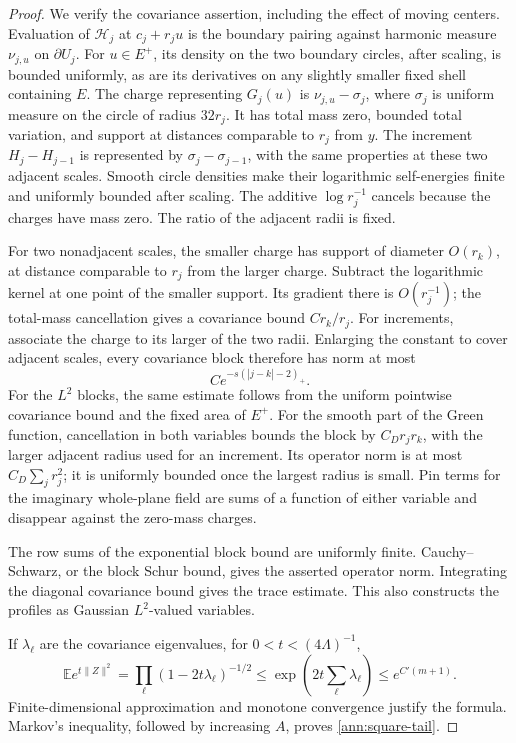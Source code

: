 \documentclass[11pt]{article}
\numberwithin{equation}{section}
\theoremstyle{definition}
\theoremstyle{remark}
\newcommand{\EE}{\mathbb E}
\newcommand{\1}{\mathbf 1}
\begin{document}
\begin{proof}
We verify the covariance assertion, including the effect of moving
centers.  Evaluation of \(\mathcal H_j\) at \(c_j+r_ju\)
is the boundary pairing against harmonic measure
\(\nu_{j,u}\) on \(\partial U_j\).  For \(u\in E^+\), its
density on the two boundary circles, after scaling, is bounded
uniformly, as are its derivatives on any slightly smaller fixed
shell containing \(E\).  The charge representing \(G_j(u)\)
is \(\nu_{j,u}-\sigma_j\), where \(\sigma_j\) is uniform measure
on the circle of radius \(32r_j\).  It has total mass zero,
bounded total variation, and support at distances comparable to
\(r_j\) from \(y\).  The increment \(H_j-H_{j-1}\) is represented
by \(\sigma_j-\sigma_{j-1}\), with the same properties at these
two adjacent scales.  Smooth circle densities make their logarithmic
self-energies finite and uniformly bounded after scaling.  The
additive \(\log r_j^{-1}\) cancels because the charges have mass
zero.  The ratio of the adjacent radii is fixed.

For two nonadjacent scales, the smaller charge has support of
diameter \(O(r_k)\), at distance comparable to \(r_j\) from
the larger charge.  Subtract the logarithmic kernel at one point
of the smaller support.  Its gradient there is \(O(r_j^{-1})\);
the total-mass cancellation gives a covariance bound
\(C r_k/r_j\).  For increments, associate the charge to its
larger of the two radii.  Enlarging the constant to cover adjacent
scales, every covariance block therefore has norm at most
\[
 C e^{-s(|j-k|-2)_+}.
\]
For the \(L^2\) blocks, the same estimate follows from the uniform
pointwise covariance bound and the fixed area of \(E^+\).
For the smooth part of the Green function, cancellation in both
variables bounds the block by \(C_Dr_jr_k\), with the larger
adjacent radius used for an increment.  Its operator norm is at
most \(C_D\sum_jr_j^2\); it is uniformly bounded once the largest
radius is small.  Pin terms for the imaginary whole-plane field
are sums of a function of either variable and disappear against
the zero-mass charges.

The row sums of the exponential block bound are uniformly finite.
Cauchy--Schwarz, or the block Schur bound, gives the asserted operator
norm.  Integrating the diagonal covariance bound gives the trace
estimate.  This also constructs the profiles as Gaussian
\(L^2\)-valued variables.

If \(\lambda_\ell\) are the covariance eigenvalues, for
\(0<t<(4\Lambda)^{-1}\),
\[
 \EE e^{t\|Z\|^2}
 =\prod_\ell(1-2t\lambda_\ell)^{-1/2}
 \le \exp\!\left(2t\sum_\ell\lambda_\ell\right)
 \le e^{C'(m+1)}.
\]
Finite-dimensional approximation and monotone convergence justify
the formula.  Markov's inequality, followed by increasing \(A\),
proves \eqref{ann:square-tail}.
\end{proof}
\end{document}
